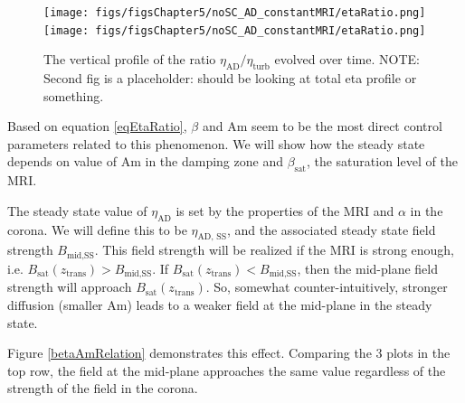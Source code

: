 \begin{figure}[p]
\centering
\texttt{[image: figs/figsChapter5/noSC\_AD\_constantMRI/etaRatio.png]}
\texttt{[image: figs/figsChapter5/noSC\_AD\_constantMRI/etaRatio.png]}
\caption{The vertical profile of the ratio $\eta_\text{AD}/\eta_\text{turb}$ evolved over time.  NOTE: Second fig is a placeholder: should be looking at total eta profile or something.  }
\label{etaRatio}
\end{figure}

Based on equation \ref{eqEtaRatio}, $\beta$ and Am seem to be the most direct control parameters related to this phenomenon.  We will show how the steady state depends on value of Am in the damping zone and $\beta_{\text{sat}}$, the saturation level of the MRI.

The steady state value of $\eta_{\text{AD}}$ is set by the properties of the MRI and $\alpha$ in the corona.  We will define this to be $\eta_{\text{AD, SS}}$, and the associated steady state field strength $B_{\text{mid,SS}}$.  This field strength will be realized if the MRI is strong enough, i.e. $B_{\text{sat}}(z_\text{trans}) > B_{\text{mid,SS}}$.  If $B_{\text{sat}}(z_\text{trans}) < B_{\text{mid,SS}}$, then the mid-plane field strength will approach $B_{\text{sat}}(z_\text{trans})$.  So, somewhat counter-intuitively, stronger diffusion (smaller Am) leads to a weaker field at the mid-plane in the steady state.  

Figure \ref{betaAmRelation} demonstrates this effect.  Comparing the 3 plots in the top row, the field at the mid-plane approaches the same value regardless of the strength of the field in the corona.  



